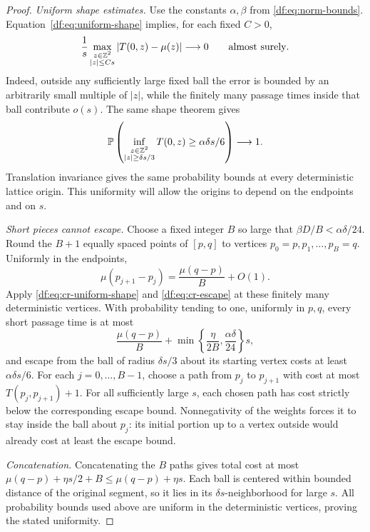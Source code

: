 \begin{proof}
\emph{Uniform shape estimates.}
Use the constants $\alpha,\beta$ from \eqref{df:eq:norm-bounds}.
Equation~\eqref{df:eq:uniform-shape} implies, for each fixed $C>0$,
\begin{equation}\label{df:eq:cr-uniform-shape}
 \frac1s\max_{\substack{z\in\mathbb Z^2\\|z|\le Cs}}
       \left\lvert T(0,z)-\mu(z)\right\rvert\longrightarrow0
 \qquad\text{almost surely}.
\end{equation}
Indeed, outside any sufficiently large fixed ball the error is bounded by an
arbitrarily small multiple of $|z|$, while the finitely many passage
times inside that ball contribute $o(s)$. The same shape theorem gives
\begin{equation}\label{df:eq:cr-escape}
 \mathbb P\left(
   \inf_{\substack{z\in\mathbb Z^2\\|z|\ge\delta s/3}}
       T(0,z)\ge\alpha\delta s/6
       \right)\longrightarrow1.
\end{equation}
Translation invariance gives the same probability bounds at every
deterministic lattice origin. This uniformity will allow the origins to
depend on the endpoints and on $s$.

\emph{Short pieces cannot escape.}
Choose a fixed integer $B$ so large that $\beta D/B<\alpha\delta/24$.
Round the $B+1$ equally spaced points of $[p,q]$ to vertices
$p_0=p,p_1,\ldots,p_B=q$. Uniformly in the endpoints,
\[
 \mu(p_{j+1}-p_j)=\frac{\mu(q-p)}{B}+O(1).
\]
Apply \eqref{df:eq:cr-uniform-shape} and \eqref{df:eq:cr-escape} at these
finitely many deterministic vertices. With probability tending to one,
uniformly in $p,q$, every short passage time is at most
\[
 \frac{\mu(q-p)}B+
       \min\left\{\frac{\eta}{2B},\frac{\alpha\delta}{24}\right\}s,
\]
and escape from the ball of radius $\delta s/3$ about its starting vertex
costs at least $\alpha\delta s/6$. For each $j=0,\ldots,B-1$, choose a path
from $p_j$ to $p_{j+1}$ with cost at most $T(p_j,p_{j+1})+1$.
For all sufficiently large $s$, each chosen path has cost strictly below
the corresponding escape bound. Nonnegativity of the weights forces it
to stay inside the ball about $p_j$: its initial portion up to a vertex
outside would already cost at least the escape bound.

\emph{Concatenation.}
Concatenating the $B$ paths gives total cost
at most $\mu(q-p)+\eta s/2+B\le\mu(q-p)+\eta s$. Each ball is centered
within bounded distance of the original segment, so it lies in its
$\delta s$-neighborhood for large $s$. All probability bounds used above
are uniform in the deterministic vertices, proving the stated uniformity.
\end{proof}

